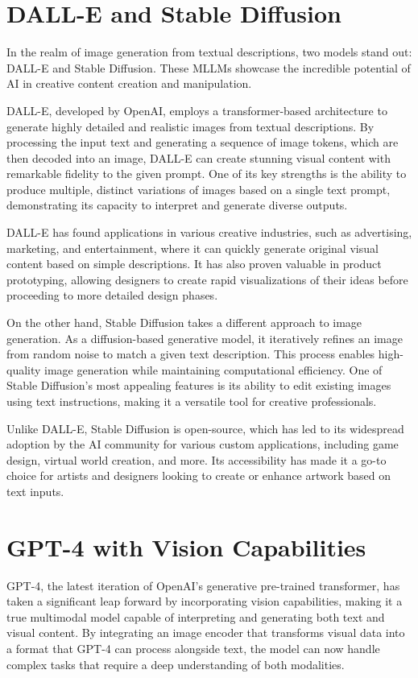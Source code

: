 \section{DALL-E and Stable Diffusion}

In the realm of image generation from textual descriptions, two models stand out: DALL-E and Stable Diffusion. These MLLMs showcase the incredible potential of AI in creative content creation and manipulation.

DALL-E, developed by OpenAI, employs a transformer-based architecture to generate highly detailed and realistic images from textual descriptions. By processing the input text and generating a sequence of image tokens, which are then decoded into an image, DALL-E can create stunning visual content with remarkable fidelity to the given prompt. One of its key strengths is the ability to produce multiple, distinct variations of images based on a single text prompt, demonstrating its capacity to interpret and generate diverse outputs.

DALL-E has found applications in various creative industries, such as advertising, marketing, and entertainment, where it can quickly generate original visual content based on simple descriptions. It has also proven valuable in product prototyping, allowing designers to create rapid visualizations of their ideas before proceeding to more detailed design phases.

On the other hand, Stable Diffusion takes a different approach to image generation. As a diffusion-based generative model, it iteratively refines an image from random noise to match a given text description. This process enables high-quality image generation while maintaining computational efficiency. One of Stable Diffusion's most appealing features is its ability to edit existing images using text instructions, making it a versatile tool for creative professionals.

Unlike DALL-E, Stable Diffusion is open-source, which has led to its widespread adoption by the AI community for various custom applications, including game design, virtual world creation, and more. Its accessibility has made it a go-to choice for artists and designers looking to create or enhance artwork based on text inputs.

\section{GPT-4 with Vision Capabilities}

GPT-4, the latest iteration of OpenAI's generative pre-trained transformer, has taken a significant leap forward by incorporating vision capabilities, making it a true multimodal model capable of interpreting and generating both text and visual content. By integrating an image encoder that transforms visual data into a format that GPT-4 can process alongside text, the model can now handle complex tasks that require a deep understanding of both modalities.

